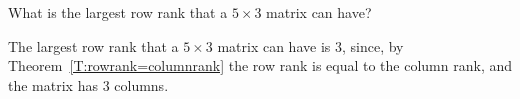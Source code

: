 \documentclass{ximera}
\begin{document}
\begin{exercise} \label{c5.8.2}
What is the largest row rank that a $5\times 3$ matrix can have?

\begin{solution}
\soln The largest row rank that a $5 \times 3$ matrix can have
is $3$, since, by Theorem~\ref{T:rowrank=columnrank} the row rank is
equal to the column rank, and the matrix has $3$ columns.

\end{solution}
\end{exercise}
\end{document}
